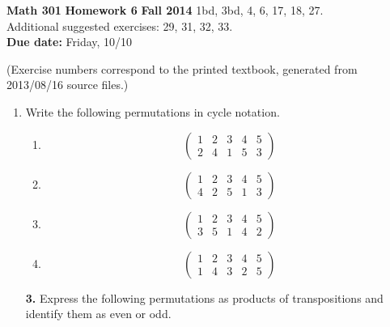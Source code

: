 \documentclass[12pt,reqno]{amsart}
\newcommand{\probskip}{\vskip1cm}
\begin{document}
\thispagestyle{empty}

\noindent \textbf{Math 301} \hskip5cm {\bf Homework 6} \hfill {\bf Fall 2014}
\vskip1cm
   1bd, 3bd, 4, 6, 17, 18, 27.\\  
   Additional suggested exercises: 29, 31, 32, 33.  \\
{\bf Due date:} Friday, 10/10

\medskip

\noindent (Exercise numbers correspond to the printed textbook, generated from 2013/08/16 source files.)

\medskip

\begin{enumerate}[{\bf 1.}]

\item %
Write the following permutations in cycle notation.
\begin{multicols}{2}
\begin{enumerate}
 
\item
\[
\begin{pmatrix}
1 & 2 & 3 & 4 & 5 \\
2 & 4 & 1 & 5 & 3
\end{pmatrix}
\]

\item
\[
\begin{pmatrix}
1 & 2 & 3 & 4 & 5 \\
4 & 2 & 5 & 1 & 3
\end{pmatrix}
\]

\item
\[
\begin{pmatrix}
1 & 2 & 3 & 4 & 5 \\
3 & 5 & 1 & 4 & 2
\end{pmatrix}
\]

\item
\[
\begin{pmatrix}
1 & 2 & 3 & 4 & 5 \\
1 & 4 & 3 & 2 & 5
\end{pmatrix}
\]

\end{enumerate}
\end{multicols}

\probskip
 
\item[{\bf 3.}] 
Express the following permutations as products of transpositions and
identify them as even or odd. 
\begin{multicols}{2}
\begin{enumerate}
 

\end{enumerate}
\end{multicols}
\end{enumerate}
\end{document}
